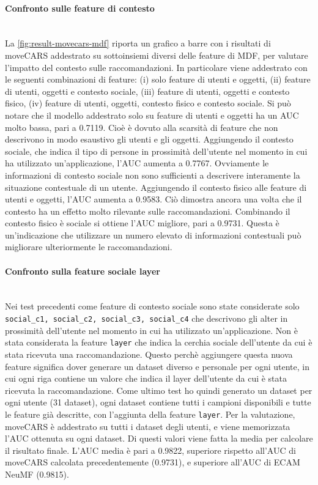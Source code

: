 \documentclass[12pt,italian]{report}
\newcommand{\myparagraph}[1]{\paragraph{#1}\mbox{}\\} %
\begin{document}
\myparagraph{Confronto sulle feature di contesto}
La \autoref{fig:result-movecars-mdf} riporta un grafico a barre con i risultati di moveCARS addestrato su sottoinsiemi diversi delle feature di MDF, per valutare l'impatto del contesto sulle raccomandazioni. In particolare viene addestrato con le seguenti combinazioni di feature: (i) solo feature di utenti e oggetti, (ii) feature di utenti, oggetti e contesto sociale, (iii) feature di utenti, oggetti e contesto fisico, (iv) feature di utenti, oggetti, contesto fisico e contesto sociale. Si può notare che il modello addestrato solo su feature di utenti e oggetti ha un AUC molto bassa, pari a 0.7119. Cioè è dovuto alla scarsità di feature che non descrivono in modo esaustivo gli utenti e gli oggetti. Aggiungendo il contesto sociale, che indica il tipo di persone in prossimità dell'utente nel momento in cui ha utilizzato un'applicazione, l'AUC aumenta a 0.7767. Ovviamente le informazioni di contesto sociale non sono sufficienti a descrivere interamente la situazione contestuale di un utente. Aggiungendo il contesto fisico alle feature di utenti e oggetti, l'AUC aumenta a 0.9583. Ciò dimostra ancora una volta che il contesto ha un effetto molto rilevante sulle raccomandazioni. Combinando il contesto fisico è sociale si ottiene l'AUC migliore, pari a 0.9731. Questa è un'indicazione che utilizzare un numero elevato di informazioni contestuali può migliorare ulteriormente le raccomandazioni.

\myparagraph{Confronto sulla feature sociale layer}
Nei test precedenti come feature di contesto sociale sono state considerate solo \texttt{social\_c1, social\_c2, social\_c3, social\_c4} che descrivono gli alter in prossimità dell'utente nel momento in cui ha utilizzato un'applicazione. Non è stata considerata la feature \texttt{layer} che indica la cerchia sociale dell'utente da cui è stata ricevuta una raccomandazione. Questo perchè aggiungere questa nuova feature significa dover generare un dataset diverso e personale per ogni utente, in cui ogni riga contiene un valore che indica il layer dell'utente da cui è stata ricevuta la raccomandazione. Come ultimo test ho quindi generato un dataset per ogni utente (31 dataset), ogni dataset contiene tutti i campioni disponibili e tutte le feature già descritte, con l'aggiunta della feature \texttt{layer}. Per la valutazione, moveCARS è addestrato su tutti i dataset degli utenti, e viene memorizzata l'AUC ottenuta su ogni dataset. Di questi valori viene fatta la media per calcolare il risultato finale. L'AUC media è pari a 0.9822, superiore rispetto all'AUC di moveCARS calcolata precedentemente (0.9731), e superiore all'AUC di ECAM NeuMF (0.9815).
\end{document}
